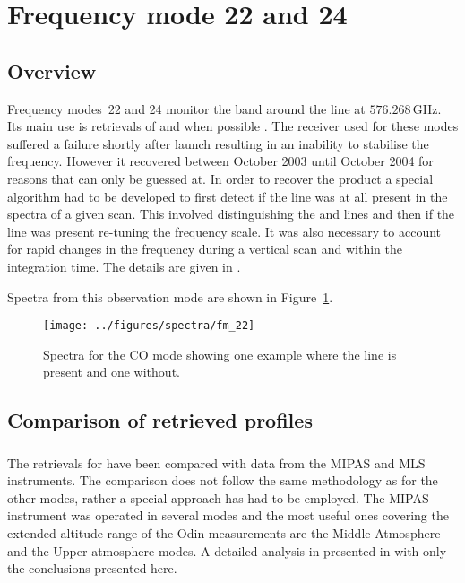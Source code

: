 \section{Frequency mode 22 and 24}
\label{sec:fm22}

\subsection{Overview}
\label{sec:fm22:overview}
Frequency modes~22 and 24 monitor the band around the  line at
$576.268\,\mathrm{GHz}$. Its main use is retrievals of  and when
possible . The receiver used for these modes suffered a failure
shortly after launch resulting in an inability to stabilise the frequency.
However it recovered between October 2003 until October 2004 for reasons that
can only be guessed at. In order to recover the  product a special
algorithm had to be developed to first detect if the  line was at
all present in the spectra of a given scan. This involved distinguishing the
 and  lines and then if the  line was present
re-tuning the frequency scale. It was also necessary to account for rapid
changes in the frequency during a vertical scan and within the integration
time. The details are given in \cite{grieco2020a}.

Spectra from this observation mode are shown in Figure~\ref{fig:spectra:22}.

\begin{figure}[ht]
    \centering
    \texttt{[image: ../figures/spectra/fm\_22]}
    \caption{Spectra for the CO mode showing one example where the line is present and one without.
    }\label{fig:spectra:22}
\end{figure}


\subsection{Comparison of retrieved profiles}
\label{sec:fm22:comparison}



\subsubsection{}
\label{sec:fm22:comparison:CO}
The retrievals for  have been compared with data from the MIPAS and
MLS instruments.  The comparison does not follow the same methodology as for the other modes, rather a special approach has had to be employed. 
The  MIPAS instrument was operated in several modes and the most useful ones covering the extended altitude range of the Odin measurements are the Middle Atmosphere and the Upper atmosphere modes.  A detailed analysis in presented in \cite{grieco2020a} with only the conclusions presented here.

